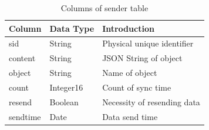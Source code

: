 \documentclass[twocolumn,10pt]{article}
\begin{document}
\begin{table}[tbp]
	\centering  
	\begin{tabular}{l|l|l}  
		\hline
		Column &Data Type & Introduction\\ 
		\hline  
		sid &String & Physical unique identifier\\
		content & String & JSON String of object\\ 
		object & String & Name of object\\
		count & Integer16 & Count of sync time\\
		resend & Boolean &Necessity of resending data \\
		sendtime & Date & Data send time\\
		\hline
	\end{tabular}
	\caption{Columns of sender table}
\end{table}


{
	\footnotesize
	
}
\end{document}
